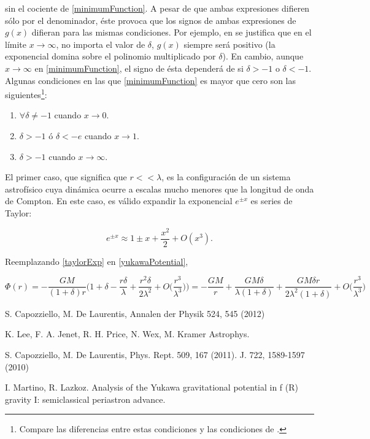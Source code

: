\documentclass{article}
\begin{document}
sin el cociente de \eqref{minimumFunction}. A pesar de que ambas expresiones difieren sólo por el denominador, éste provoca que los signos de ambas expresiones de $g(x)$ difieran para las mismas condiciones. Por ejemplo, en \cite{Capozziello} se justifica que en el límite $x\rightarrow\infty$, no importa el valor de  $\delta$, $g(x)$ siempre será positivo (la exponencial domina sobre el polinomio multiplicado por $\delta$). En cambio, aunque $x\rightarrow\infty$ en \eqref{minimumFunction}, el signo de ésta dependerá de si $\delta>-1$ o $\delta<-1$. Algunas condiciones en las que \eqref{minimumFunction} es mayor que cero son las siguientes\footnote{Compare las diferencias entre estas condiciones y las condiciones de \cite{Capozziello}.}:

\begin{enumerate}
	\item $\forall\delta\neq-1$ cuando $x\rightarrow 0$.
	\item $\delta>-1$ ó $\delta<-e$ cuando $x\rightarrow 1$.
	\item $\delta>-1$ cuando $x\rightarrow\infty$.
\end{enumerate}

El primer caso, que significa que $r<<\lambda$, es la configuración de un sistema astrofísico cuya dinámica ocurre a escalas mucho menores que la longitud de onda de Compton. En este caso, es válido expandir la exponencial $e^{\pm x}$ es series de Taylor:

\begin{equation}\label{taylorExp}
	e^{\pm x}\approx 1\pm x+\frac{x^2}{2}+O(x^3).
\end{equation}

Reemplazando \eqref{taylorExp} en \eqref{yukawaPotential},

$$\Phi(r)=-\frac{GM}{(1+\delta)r}\Big(1+\delta-\frac{r\delta}{\lambda}+\frac{r^2\delta}{2\lambda^2}+O\Big(\frac{r^3}{\lambda^3}\Big)\Big)=-\frac{GM}{r}+\frac{GM\delta}{\lambda(1+\delta)}+\frac{GM\delta r}{2\lambda^2(1+\delta)}+O\Big(\frac{r^3}{\lambda^3}\Big)$$
\begin{thebibliography}{9}
	 S. Capozziello, M. De Laurentis, Annalen der Physik 524, 545 (2012) 
	
	 K. Lee, F. A. Jenet, R. H. Price, N. Wex, M. Kramer Astrophys.
	
	 S. Capozziello, M. De Laurentis, Phys. Rept. 509, 167 (2011).
	J. 722, 1589-1597 (2010)
	
	 I. Martino, R. Lazkoz. Analysis of the Yukawa gravitational potential in f (R) gravity I: semiclassical periastron advance.
\end{thebibliography}
\end{document}
